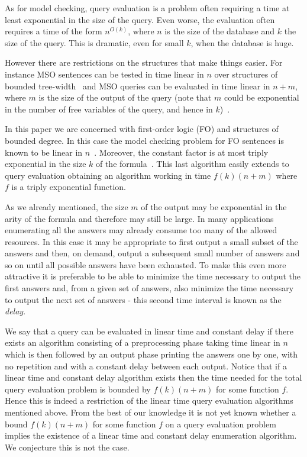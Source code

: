 \documentclass{LMCS}
\begin{document}
As for model checking, query evaluation is a problem often requiring a time at
least exponential in the size of the query. Even worse, the evaluation often
requires a time of the form $n^{O(k)}$, where $n$ is the size of the database
and $k$ the size of the query. This is dramatic, even for small $k$, when the
database is huge.

However there are restrictions on the structures that make things easier. For
instance MSO sentences can be tested in time linear in $n$ over structures of
bounded tree-width~\cite{Courcelle90} and MSO queries can be evaluated in time
linear in $n+m$, where $m$ is the size of the output of the query (note that
$m$ could be exponential in the number of free variables of the query, and
hence in $k$)~\cite{FlumFrickGrohe02}.

In this paper we are concerned with first-order logic (FO) and structures of
bounded degree. In this case the model checking problem for FO sentences is known to be
linear in $n$~\cite{Seese96}. Moreover, the constant factor is at most triply
exponential in the size $k$ of the formula~\cite{FrickGrohe04}. This last
algorithm easily extends to query evaluation obtaining an algorithm working in
time $f(k)(n+m)$ where $f$ is a triply exponential function.

As we already mentioned, the size $m$ of the output may be exponential in the
arity of the formula and therefore may still be large. In many applications
enumerating all the answers may already consume too many of the allowed
resources. In this case it may be appropriate to first output a small subset of
the answers and then, on demand, output a subsequent small number of answers
and so on until all possible answers have been exhausted. To make this even
more attractive it is preferable to be able to minimize the time necessary to
output the first answers and, from a given set of answers, also minimize the
time necessary to output the next set of answers - this second time interval is
known as the \emph{delay}.

We say that a query can be evaluated in linear time and constant delay if
there exists an algorithm consisting of a preprocessing phase taking time
linear in $n$ which is then followed by an output phase printing the answers
one by one, with no repetition and with a constant delay between each output.
Notice that if a linear time and constant delay algorithm exists then the time
needed for the total query evaluation problem is bounded by $f(k)(n+m)$ for
some function $f$. Hence this is indeed a restriction of the linear time query
evaluation algorithms mentioned above. From the best of our knowledge it is not
yet known whether a bound $f(k)(n+m)$ for some function $f$ on a query evaluation
problem implies the existence of a linear time and constant delay enumeration
algorithm. We conjecture this is not the case.
\end{document}
